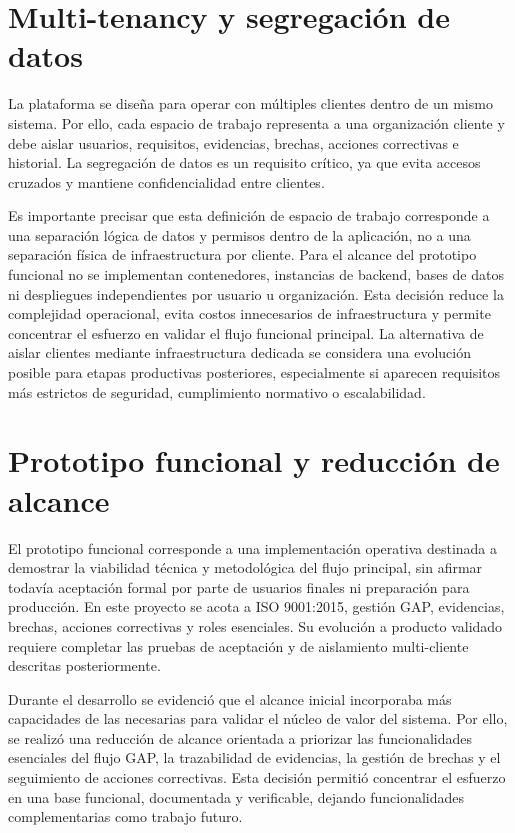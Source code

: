\documentclass[final]{udpthesis}
\begin{document}
\section{Multi-tenancy y segregación de datos}

La plataforma se diseña para operar con múltiples clientes dentro de un mismo sistema. Por ello, cada espacio de trabajo representa a una organización cliente y debe aislar usuarios, requisitos, evidencias, brechas, acciones correctivas e historial. La segregación de datos es un requisito crítico, ya que evita accesos cruzados y mantiene confidencialidad entre clientes.

Es importante precisar que esta definición de espacio de trabajo corresponde a una separación lógica de datos y permisos dentro de la aplicación, no a una separación física de infraestructura por cliente. Para el alcance del prototipo funcional no se implementan contenedores, instancias de backend, bases de datos ni despliegues independientes por usuario u organización. Esta decisión reduce la complejidad operacional, evita costos innecesarios de infraestructura y permite concentrar el esfuerzo en validar el flujo funcional principal. La alternativa de aislar clientes mediante infraestructura dedicada se considera una evolución posible para etapas productivas posteriores, especialmente si aparecen requisitos más estrictos de seguridad, cumplimiento normativo o escalabilidad.

\section{Prototipo funcional y reducción de alcance}

El prototipo funcional corresponde a una implementación operativa destinada a demostrar la viabilidad técnica y metodológica del flujo principal, sin afirmar todavía aceptación formal por parte de usuarios finales ni preparación para producción. En este proyecto se acota a ISO 9001:2015, gestión GAP, evidencias, brechas, acciones correctivas y roles esenciales. Su evolución a producto validado requiere completar las pruebas de aceptación y de aislamiento multi-cliente descritas posteriormente.

Durante el desarrollo se evidenció que el alcance inicial incorporaba más capacidades de las necesarias para validar el núcleo de valor del sistema. Por ello, se realizó una reducción de alcance orientada a priorizar las funcionalidades esenciales del flujo GAP, la trazabilidad de evidencias, la gestión de brechas y el seguimiento de acciones correctivas. Esta decisión permitió concentrar el esfuerzo en una base funcional, documentada y verificable, dejando funcionalidades complementarias como trabajo futuro.
\end{document}
